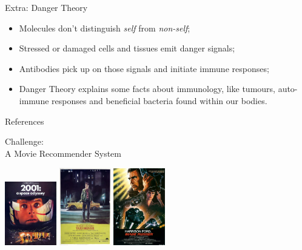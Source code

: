 \documentclass[xcolor=svgnames]{beamer}
\newcommand{\introframe}[2]{
    \begin{frame}
       \vfill
       \hfill\Huge{#1}
       
       \vspace{1em}
       
       \hfill\Large{#2}
       \vfill
    \end{frame}
}
\begin{document}
    \begin{frame}{Extra: Danger Theory}
        \begin{itemize}
            \item Molecules don't distinguish \textit{self} from \textit{non-self};
            \item Stressed or damaged cells and tissues emit danger signals;
            \item Antibodies pick up on those signals and initiate immune responses;
            \item Danger Theory explains some facts about immunology, like tumours, auto-immune responses and beneficial bacteria found within our bodies.
        \end{itemize}
    \end{frame}
    
    \begin{frame}{References}
        
        
        \nocite{*}
    \end{frame}     
            
    \introframe{Challenge:\\ \hfill \Large{A Movie Recommender System}}{ 
        \includegraphics[width=85px]{fig/2001-poster}
        \hfill
        \includegraphics[width=85px]{fig/taxidriverposter}
        \hfill
        \includegraphics[width=85px]{fig/blade_runner}}
        
\end{document}
